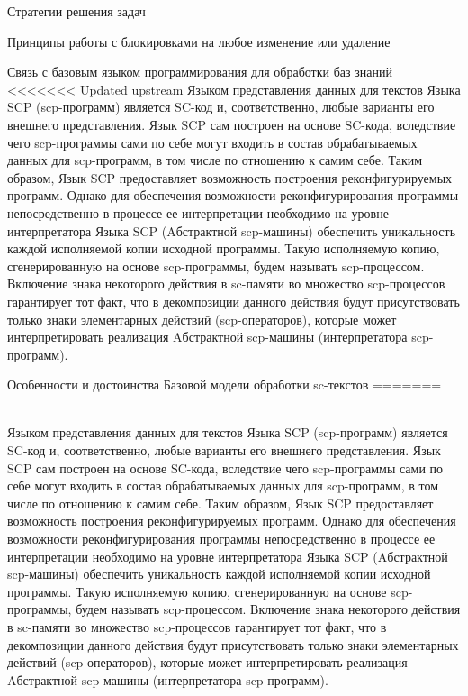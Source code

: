 \begin{frame}{Стратегии решения задач}
\begin{frame}{\large Принципы работы с блокировками на любое изменение или удаление}
\begin{frame}{Связь с базовым языком программирования для обработки баз
знаний}
<<<<<<< Updated upstream
Языком представления данных для текстов Языка SCP (scp-программ) является SC-код и, соответственно, любые варианты его внешнего представления. Язык SCP сам построен на основе SC-кода, вследствие чего scp-программы сами по себе могут входить в состав обрабатываемых данных для scp-программ, в том числе по отношению к самим себе. Таким образом, Язык SCP предоставляет возможность построения реконфигурируемых программ. Однако для обеспечения возможности реконфигурирования программы непосредственно в процессе ее интерпретации необходимо на уровне интерпретатора Языка SCP (Aбстрактной scp-машины) обеспечить уникальность каждой исполняемой копии исходной программы. Такую исполняемую копию, сгенерированную на основе scp-программы, будем называть scp-процессом. Включение знака некоторого действия в sc-памяти во множество scp-процессов гарантирует тот факт, что в декомпозиции данного действия будут присутствовать только знаки элементарных действий (scp-операторов), которые может интерпретировать реализация Aбстрактной scp-машины (интерпретатора scp-программ).

\begin{frame}{Особенности и достоинства Базовой модели обработки sc-текстов}
\vspace{15}
=======
\begin{frame}{}
\vspace{30}
 \\

Языком представления данных для текстов Языка SCP (scp-программ) является SC-код и, соответственно, любые варианты его внешнего представления. Язык SCP сам построен на основе SC-кода, вследствие чего scp-программы сами по себе могут входить в состав обрабатываемых данных для scp-программ, в том числе по отношению к самим себе. Таким образом, Язык SCP предоставляет возможность построения реконфигурируемых программ. Однако для обеспечения возможности реконфигурирования программы непосредственно в процессе ее интерпретации необходимо на уровне интерпретатора Языка SCP (Aбстрактной scp-машины) обеспечить уникальность каждой исполняемой копии исходной программы. Такую исполняемую копию, сгенерированную на основе scp-программы, будем называть scp-процессом. Включение знака некоторого действия в sc-памяти во множество scp-процессов гарантирует тот факт, что в декомпозиции данного действия будут присутствовать только знаки элементарных действий (scp-операторов), которые может интерпретировать реализация Aбстрактной scp-машины (интерпретатора scp-программ).
\end{frame}


\end{frame}
\end{frame}
\end{frame}
\end{frame}
